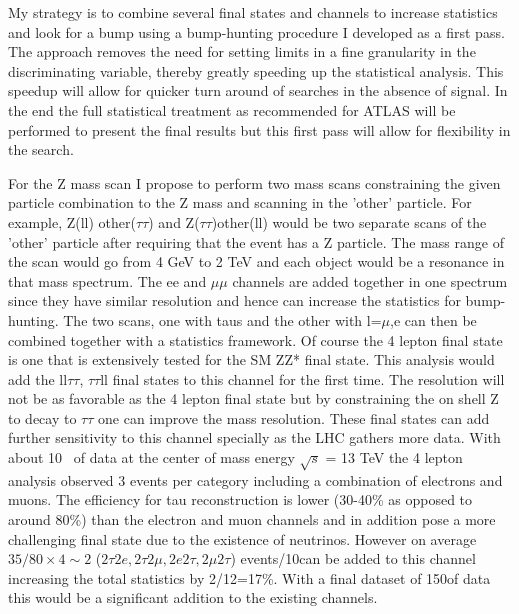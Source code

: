 My strategy is to combine several final states and channels to increase statistics and look for a bump using a bump-hunting procedure I developed as a first pass. 
The approach removes the need for setting limits in a fine granularity in the discriminating variable, thereby greatly speeding up the statistical analysis. 
This speedup will allow for quicker turn around of searches in the absence of signal.  In the end the full statistical treatment as recommended for ATLAS will be performed to present the final 
results but this first pass will allow for flexibility in the search. 

For the Z mass scan I propose to perform two mass scans constraining the given particle combination to the Z mass and scanning in the 'other' particle. 
For example, Z(ll) other($\tau\tau$) and Z($\tau\tau$)other(ll) would be two separate scans of the 'other' particle after requiring that the event has a Z particle. 
The mass range of the scan would go from 4 GeV to 2 TeV and each object would be a resonance in that mass spectrum. The ee and $\mu\mu$ channels are added together 
in one spectrum since they have similar resolution and hence can increase the statistics for bump-hunting.  
The two scans, one with taus and the other with l=$\mu$,e  can then be combined together with a statistics framework.  
Of course the 4 lepton final state is one that is extensively tested for the SM ZZ* final state. This analysis would add the ll$\tau\tau$, $\tau\tau$ll final states to this channel for the first time.  The resolution will not be as favorable as
the 4 lepton final state but by constraining the on shell Z to decay to $\tau \tau$ one can improve the mass resolution.  These final states can add further sensitivity to this channel specially as the LHC
gathers more data.  With about 10 \invfb\ of data at the center of mass energy $\sqrt s$ = 13 TeV the 4 lepton analysis observed 3 events per category including a combination of electrons and muons.  The efficiency for tau reconstruction is lower (30-40\% as opposed to around 80\%) than the electron and muon channels and in 
addition pose a more challenging final state due to the existence of neutrinos.
However on average $35/80\times4\sim 2$ ($2\tau2e, 2\tau2\mu, 2e2\tau,2\mu2\tau$) events/10\invfb can be added to this channel~\cite{2016:4l} increasing the total statistics by 2/12=17\%. With a final dataset of 150\invfb of data this would be a significant addition to the existing channels.

